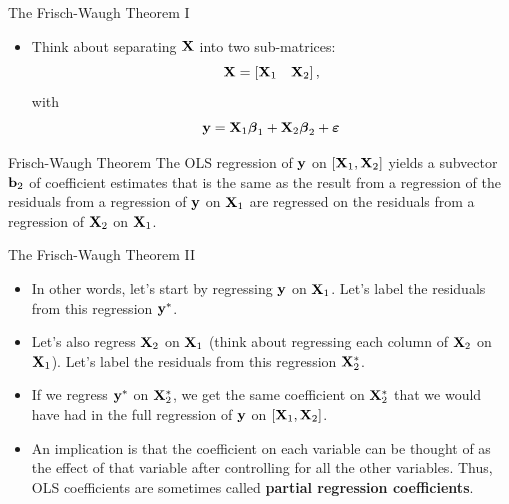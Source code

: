 \documentclass[english,xcolor={dvipsnames},aspectratio=169]{beamer}
\begin{document}
\begin{frame}{The Frisch-Waugh Theorem I}
\begin{itemize}
	\item Think about separating $ {\bf X}$ into two sub-matrices:\[
	 {\bf X} =  \left[{\bf X}_{1}\quad  {\bf X}_2 \right],
	\]
	with \[
	{\bf y} = {\bf X}_{1} \boldsymbol{\beta}_{1} +  {\bf X}_{2} \boldsymbol{\beta}_{2} + \boldsymbol{\varepsilon}
	\]
\end{itemize}

\begin{block}{Frisch-Waugh Theorem}
The OLS regression of ${\bf y} $ on $\left[{\bf X}_{1},  {\bf X}_2 \right]$
yields a subvector ${\bf b}_{2}$ of coefficient estimates that is the same as
the result from a regression of the residuals from a regression
of ${\bf y} $ on ${\bf X}_{1}$ are regressed on the residuals
from a regression of ${\bf X}_{2}$ on ${\bf X}_{1}$.

\end{block}
\end{frame}

\begin{frame}{The Frisch-Waugh Theorem II}
\begin{itemize}
	\item In other words, let's start by regressing ${\bf y} $ on ${\bf X}_{1}$.
	Let's label the residuals from this regression ${\bf y}^{*} $.

	\item Let's also regress ${\bf X}_{2}$ on ${\bf X}_{1}$ 
	(think about regressing each column of ${\bf X}_{2}$ on ${\bf X}_{1}$).
	Let's label the residuals from this regression ${\bf X}^{*}_{2}$.

	\item If we regress ${\bf y}^{*}$ on ${\bf X}^{*}_{2}$, we get the same
	coefficient on ${\bf X}^{*}_{2}$ that we would have had in the full
	regression of  ${\bf y} $ on $\left[{\bf X}_{1},  {\bf X}_2 \right]$.

	\item An implication is that
	the coefficient on each variable can be thought of as the effect
	of that variable after controlling for all the other variables. Thus,
	OLS coefficients are sometimes called {\bf partial regression coefficients}.

\end{itemize}
\end{frame}
\end{document}
